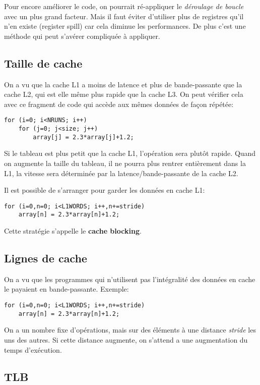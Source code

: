 Pour encore améliorer le code, on pourrait ré-appliquer le \textit{déroulage de boucle} avec un plus grand facteur.
Mais il faut éviter d'utiliser plus de registres qu'il n'en existe (register spill) car cela diminue les performances. 
De plus c'est une méthode qui peut s'avérer compliquée à appliquer.
	
	\subsection{Taille de cache}
	
On a vu que la cache L1 a moins de latence et plus de bande-passante que la cache L2, qui est elle même plus rapide que la cache L3. On peut vérifier cela  avec ce fragment de code qui accède aux mêmes données de façon répétée:
\begin{verbatim}
for (i=0; i<NRUNS; i++)
    for (j=0; j<size; j++)
        array[j] = 2.3*array[j]+1.2;
\end{verbatim}
Si le tableau est plus petit que la cache L1, l'opération sera plutôt rapide. Quand on augmente la taille du  tableau, il ne pourra plus rentrer entièrement dans la L1, la vitesse sera déterminée par la latence/bande-passante de la cache L2.

Il est possible de s'arranger pour garder les données en cache L1:
\begin{verbatim}
for (i=0,n=0; i<L1WORDS; i++,n+=stride)
    array[n] = 2.3*array[n]+1.2;
\end{verbatim}

Cette stratégie s'appelle le \textbf{cache blocking}.


	\subsection{Lignes de cache}

On a vu que les programmes qui n'utilisent pas l'intégralité des données en cache le payaient en bande-passante.
Exemple:
\begin{verbatim}
for (i=0,n=0; i<L1WORDS; i++,n+=stride)
    array[n] = 2.3*array[n]+1.2;
\end{verbatim}
On a un nombre fixe d'opérations, mais sur des éléments à une distance \textit{stride} les uns des autres. Si cette distance augmente, on s'attend a une augmentation du temps d'exécution. 

	
	\subsection{TLB}


